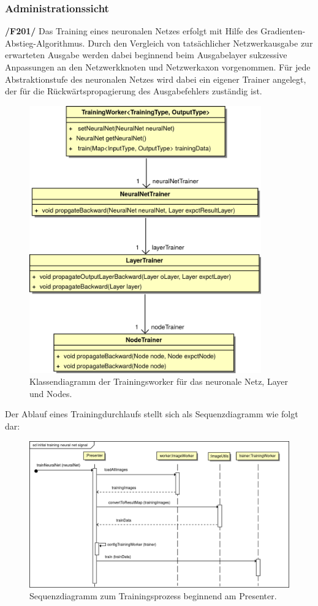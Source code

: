 \subsubsection{Administrationssicht}

\textbf{/F201/} Das Training eines neuronalen Netzes erfolgt mit Hilfe des Gradienten-Abstieg-Algorithmus. Durch den Vergleich von tatsächlicher Netzwerkausgabe zur erwarteten Ausgabe werden dabei beginnend beim Ausgabelayer sukzessive Anpassungen an den Netzwerkknoten und Netzwerkaxon vorgenommen. Für jede Abstraktionstufe des neuronalen Netzes wird dabei ein eigener Trainer angelegt, der für die Rückwärtspropagierung des Ausgabefehlers zuständig ist.\\[-0.5cm]
\begin{figure}[H]
\begin{center}
\includegraphics[width=10cm]{Abbildungen/UML/jan/trainerCD.png}
\caption{Klassendiagramm der Trainingsworker für das neuronale Netz, Layer und Nodes.}
\label{fig_cdTraining}
\end{center}
\end{figure}
Der Ablauf eines Trainingdurchlaufs stellt sich als Sequenzdiagramm wie folgt dar:
\begin{figure}[H]
\begin{center}
\includegraphics[width=14.2cm]{Abbildungen/UML/jan/trainNeuralNet.png}
\caption{Sequenzdiagramm zum Trainingsprozess beginnend am Presenter.}
\label{fig_sdTraining}
\end{center}
\end{figure}

